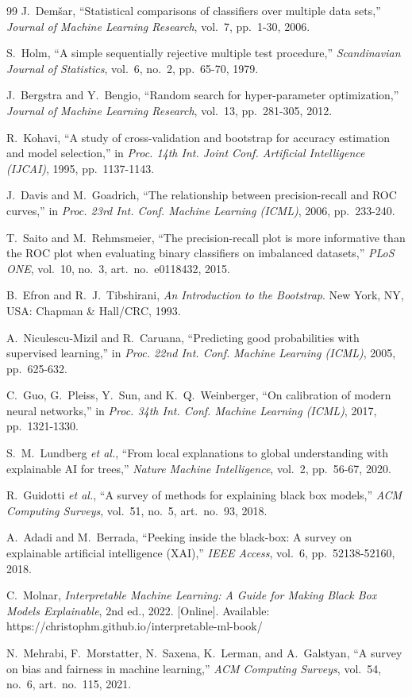 \documentclass[conference]{IEEEtran}
\begin{document}
\begin{thebibliography}{99}
J.~Dem\v{s}ar, ``Statistical comparisons of classifiers over multiple data
sets,'' \emph{Journal of Machine Learning Research}, vol.~7, pp.~1-30, 2006.

S.~Holm, ``A simple sequentially rejective multiple test procedure,''
\emph{Scandinavian Journal of Statistics}, vol.~6, no.~2, pp.~65-70, 1979.

J.~Bergstra and Y.~Bengio, ``Random search for hyper-parameter
optimization,'' \emph{Journal of Machine Learning Research}, vol.~13,
pp.~281-305, 2012.

R.~Kohavi, ``A study of cross-validation and bootstrap for accuracy
estimation and model selection,'' in \emph{Proc. 14th Int. Joint Conf.
Artificial Intelligence (IJCAI)}, 1995, pp.~1137-1143.

J.~Davis and M.~Goadrich, ``The relationship between precision-recall and
ROC curves,'' in \emph{Proc. 23rd Int. Conf. Machine Learning (ICML)}, 2006,
pp.~233-240.

T.~Saito and M.~Rehmsmeier, ``The precision-recall plot is more informative
than the ROC plot when evaluating binary classifiers on imbalanced
datasets,'' \emph{PLoS ONE}, vol.~10, no.~3, art.~no.~e0118432, 2015.

B.~Efron and R.~J.~Tibshirani, \emph{An Introduction to the Bootstrap}.
New York, NY, USA: Chapman \& Hall/CRC, 1993.

A.~Niculescu-Mizil and R.~Caruana, ``Predicting good probabilities with
supervised learning,'' in \emph{Proc. 22nd Int. Conf. Machine Learning
(ICML)}, 2005, pp.~625-632.

C.~Guo, G.~Pleiss, Y.~Sun, and K.~Q.~Weinberger, ``On calibration of modern
neural networks,'' in \emph{Proc. 34th Int. Conf. Machine Learning (ICML)},
2017, pp.~1321-1330.

S.~M.~Lundberg \emph{et al.}, ``From local explanations to global
understanding with explainable AI for trees,'' \emph{Nature Machine
Intelligence}, vol.~2, pp.~56-67, 2020.

R.~Guidotti \emph{et al.}, ``A survey of methods for explaining black box
models,'' \emph{ACM Computing Surveys}, vol.~51, no.~5, art.~no.~93, 2018.

A.~Adadi and M.~Berrada, ``Peeking inside the black-box: A survey on
explainable artificial intelligence (XAI),'' \emph{IEEE Access}, vol.~6,
pp.~52138-52160, 2018.

C.~Molnar, \emph{Interpretable Machine Learning: A Guide for Making Black Box
Models Explainable}, 2nd ed., 2022. [Online]. Available:
https://christophm.github.io/interpretable-ml-book/

N.~Mehrabi, F.~Morstatter, N.~Saxena, K.~Lerman, and A.~Galstyan, ``A survey
on bias and fairness in machine learning,'' \emph{ACM Computing Surveys},
vol.~54, no.~6, art.~no.~115, 2021.

\end{thebibliography}
\end{document}

